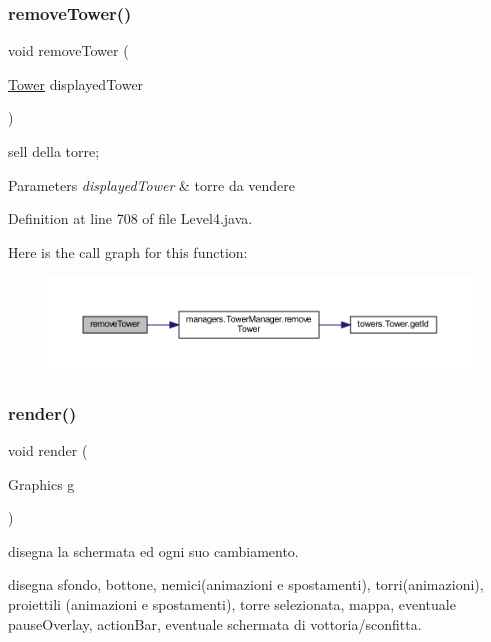 \subsubsection{\texorpdfstring{remove\+Tower()}{removeTower()}}
{\footnotesize\ttfamily void remove\+Tower (\begin{DoxyParamCaption}\item[{\hyperlink{classtowers_1_1_tower}{Tower}}]{displayed\+Tower }\end{DoxyParamCaption})}



sell della torre; 


\begin{DoxyParams}{Parameters}
{\em displayed\+Tower} & torre da vendere \\
\hline
\end{DoxyParams}


Definition at line 708 of file Level4.\+java.

Here is the call graph for this function\+:\nopagebreak
\begin{figure}[H]
\begin{center}
\leavevmode
\includegraphics[width=350pt]{classscenes_1_1_level4_addba85b44e35a186e066b2e801f433c4_cgraph}
\end{center}
\end{figure}
\mbox{\label{classscenes_1_1_level4_a203b6ad9d5e4d54dd1152986eec4dedc}} 
\subsubsection{\texorpdfstring{render()}{render()}}
{\footnotesize\ttfamily void render (\begin{DoxyParamCaption}\item[{Graphics}]{g }\end{DoxyParamCaption})}



disegna la schermata ed ogni suo cambiamento. 

disegna sfondo, bottone, nemici(animazioni e spostamenti), torri(animazioni), proiettili (animazioni e spostamenti), torre selezionata, mappa, eventuale pause\+Overlay, action\+Bar, eventuale schermata di vottoria/sconfitta.


